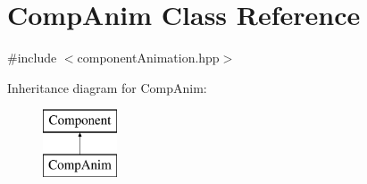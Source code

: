 \hypertarget{class_comp_anim}{\section{Comp\-Anim Class Reference}
\label{class_comp_anim}
}


{\ttfamily \#include $<$component\-Animation.\-hpp$>$}

Inheritance diagram for Comp\-Anim\-:\begin{figure}[H]
\begin{center}
\leavevmode
\includegraphics[height=2.000000cm]{class_comp_anim}
\end{center}
\end{figure}
